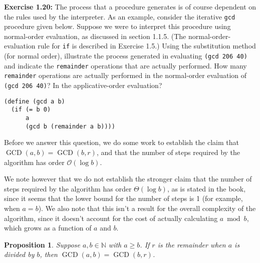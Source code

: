 \documentclass{article}
\newtheorem{proposition}{Proposition}
\DeclareMathOperator{\GCD}{GCD}
\begin{document}

\noindent \textbf{Exercise 1.20:} The process that a procedure generates is of
course dependent on the rules used by the interpreter.  As an example, consider
the iterative \lstinline{gcd} procedure given below.  Suppose we were to
interpret this procedure using normal-order evaluation, as discussed in section
1.1.5.  (The normal-order-evaluation rule for \lstinline{if} is described in
Exercise 1.5.)  Using the substitution method (for normal order), illustrate the
process generated in evaluating \lstinline{(gcd 206 40)} and indicate the
\lstinline{remainder} operations that are actually performed.  How many
\lstinline{remainder} operations are actually performed in the normal-order
evaluation of \lstinline{(gcd 206 40)}?  In the applicative-order evaluation?
\vspace{3mm}
\begin{lstlisting}[style=scheme]
(define (gcd a b)
  (if (= b 0)
      a
      (gcd b (remainder a b))))
\end{lstlisting}
\vspace{10mm}




Before we answer this question, we do some work to establish the claim that
$\GCD(a,b) = \GCD(b,r)$, and that the number of steps required by the algorithm
has order $\mathcal{O}(\log b)$.

We note however that we do not establish the stronger claim that the number of
steps required by the algorithm has order $\Theta(\log b)$, as is stated in the
book, since it seems that the lower bound for the number of steps is 1 (for
example, when $a = b$).  We also note that this isn't a result for the overall
complexity of the algorithm, since it doesn't account for the cost of actually
calculating $a \bmod b$, which grows as a function of $a$ and $b$.

\vspace{5mm}

\begin{proposition}
  Suppose $a, b \in \mathbb{N}$ with $a \geq b$.  If $r$ is the remainder when
  $a$ is divided by $b$, then $\GCD(a,b) = \GCD(b,r)$.
\end{proposition}
\end{document}

